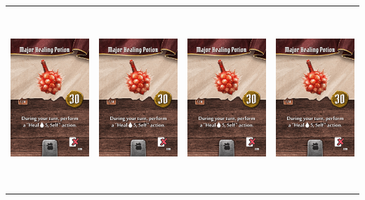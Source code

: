 \documentclass{minimal}
\begin{document}
{\begin{longtable}{llll}
\includegraphics[width=44mm,height=68mm]{./22-28/gh-027-major-healing-potion.png} &
\includegraphics[width=44mm,height=68mm]{./22-28/gh-027-major-healing-potion.png} &
\includegraphics[width=44mm,height=68mm]{./22-28/gh-027-major-healing-potion.png} &
\includegraphics[width=44mm,height=68mm]{./22-28/gh-027-major-healing-potion.png}\\ 

\end{longtable}}
\end{document}
